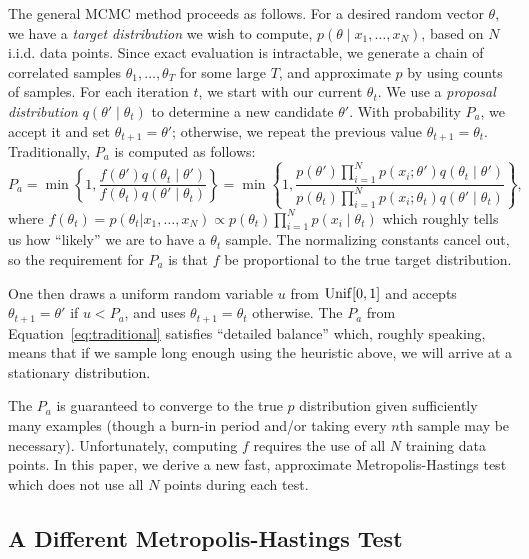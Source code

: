 \documentclass{article}
\begin{document}
The general MCMC method proceeds as follows. For a desired random vector $\theta$, we have a
\emph{target distribution} we wish to compute, $p(\theta \mid x_1, \ldots, x_N)$, based on $N$
i.i.d. data points. Since exact evaluation is intractable, we generate a chain of correlated samples
$\theta_1, \ldots, \theta_T$ for some large $T$, and approximate $p$ by using counts of samples. For
each iteration $t$, we start with our current $\theta_t$. We use a \emph{proposal distribution}
$q(\theta' \mid \theta_t)$ to determine a new candidate $\theta'$. With probability $P_a$, we accept
it and set $\theta_{t+1} = \theta'$; otherwise, we repeat the previous value $\theta_{t+1} =
\theta_t$. Traditionally, $P_a$ is computed as follows:
\begin{equation}\label{eq:traditional}
P_a = \min\left\{ 1, \frac{f(\theta')q(\theta_t \mid \theta')}{f(\theta_t)q(\theta' \mid \theta_t)}
\right\} = \min\left\{ 1, \frac{p(\theta')\prod_{i=1}^N p(x_i ; \theta')q(\theta_t \mid \theta')}{p(\theta_t)\prod_{i=1}^N p(x_i ; \theta_t)q(\theta' \mid
\theta_t)} \right\},
\end{equation}
where $f(\theta_t)=p(\theta_t|x_1,\ldots,x_N) \propto p(\theta_t)\prod_{i=1}^N p(x_i
\mid \theta_t)$ which roughly tells us how ``likely'' we are to have a $\theta_t$ sample. The
normalizing constants cancel out, so the requirement for $P_a$ is that $f$ be proportional to the
true target distribution.

One then draws a uniform random variable $u$ from ${\rm Unif}[0,1]$ and accepts $\theta_{t+1} =
\theta'$ if $u < P_a$, and uses $\theta_{t+1} = \theta_t$ otherwise. The $P_a$ from
Equation~\ref{eq:traditional} satisfies ``detailed balance'' which, roughly speaking, means that if
we sample long enough using the heuristic above, we will arrive at a stationary distribution.

The $P_a$ is guaranteed to converge to the true $p$ distribution given sufficiently many examples
(though a burn-in period and/or taking every $n$th sample may be necessary). Unfortunately,
computing $f$ requires the use of all $N$ training data points. In this paper, we derive a new fast,
approximate Metropolis-Hastings test which does not use all $N$ points during each test.

\subsection{A Different Metropolis-Hastings Test}\label{sec:faster}
\end{document}
